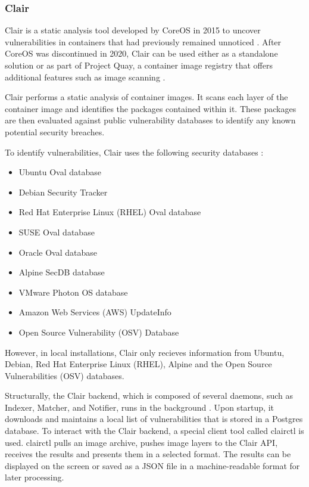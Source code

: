 \subsubsection{Clair}

Clair is a static analysis tool developed by CoreOS in 2015 to uncover vulnerabilities in containers that had previously remained unnoticed \cite{s:clair2015}. After CoreOS was discontinued in 2020, Clair can be used either as a standalone solution or as part of Project Quay, a container image registry that offers additional features such as image scanning \cite{s:what-is-clair}.

Clair performs a static analysis of container images. It scans each layer of the container image and identifies the packages contained within it. These packages are then evaluated against public vulnerability databases to identify any known potential security breaches. 

To identify vulnerabilities, Clair uses the following security databases \cite{s:clair-intro2}:

\begin{itemize}
    \item Ubuntu Oval database
    \item Debian Security Tracker
    \item Red Hat Enterprise Linux (RHEL) Oval database
    \item SUSE Oval database
    \item Oracle Oval database
    \item Alpine SecDB database
    \item VMware Photon OS database
    \item Amazon Web Services (AWS) UpdateInfo
    \item Open Source Vulnerability (OSV) Database
\end{itemize}

However, in local installations, Clair only recieves information from Ubuntu, Debian, Red Hat Enterprise Linux (RHEL), Alpine and the Open Source Vulnerabilities (OSV) databases.

Structurally, the Clair backend, which is composed of several daemons, such as Indexer, Matcher, and Notifier, runs in the background \cite{d:clairdeployment}. Upon startup, it downloads and maintains a local list of vulnerabilities that is stored in a Postgres database. To interact with the Clair backend, a special client tool called clairctl is used. clairctl pulls an image archive, pushes image layers to the Clair API, receives the results and presents them in a selected format. The results can be displayed on the screen or saved as a JSON file in a machine-readable format for later processing.

